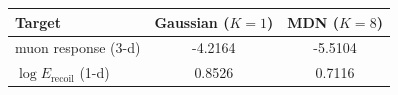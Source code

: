 \begin{tabular}{lcc}
\toprule
Target & Gaussian ($K=1$) & MDN ($K=8$) \\
\midrule
muon response (3-d) & -4.2164 & -5.5104 \\
$\log E_\mathrm{recoil}$ (1-d) & 0.8526 & 0.7116 \\
\bottomrule
\end{tabular}
